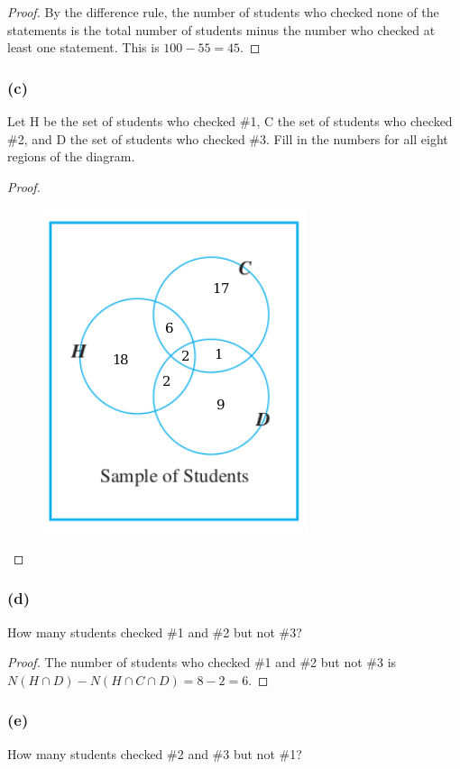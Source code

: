 \documentclass[14pt]{extarticle}
\begin{document}
\begin{proof}
By the difference rule, the number of students who checked none of the statements is the total number of students 
minus the number who checked at least one statement. This is \(100 - 55 = 45\).
\end{proof}

\subsubsection{(c)}
Let H be the set of students who checked \#1, C the set of students who checked \#2, and D the set of students who 
checked \#3. Fill in the numbers for all eight regions of the diagram.

\begin{proof}
\begin{figure}[ht!]
\centering
\includegraphics[scale=0.5]{../images/9.3.33.c.2.png}
\end{figure}
\end{proof}

\subsubsection{(d)}
How many students checked \#1 and \#2 but not \#3?

\begin{proof}
The number of students who checked \#1 and \#2 but not \#3 is \(N(H \cap D) - N(H \cap C \cap D) = 8 - 2 = 6\).
\end{proof}

\subsubsection{(e)}
How many students checked \#2 and \#3 but not \#1?
\end{document}
